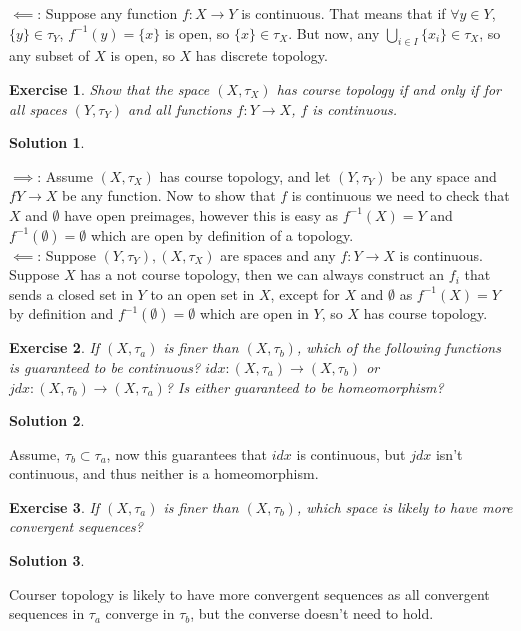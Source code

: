 \documentclass[11pt,a4paper]{article}
\newtheorem{Ex}{Exercise}
\newtheorem{Sol}{Solution}
\begin{document}
\noindent $\impliedby$: Suppose any function $f: X \rightarrow Y$ is continuous. That means that if $\forall y \in Y$, $\{y\} \in \tau_Y$, $f^{-1}(y) = \{x\}$ is open, so $\{x\} \in \tau_X$. But now, any $\bigcup_{i \in I}\{x_i\} \in \tau_X$, so any subset of $X$ is open, so $X$ has discrete topology.

\begin{Ex}
	Show that the space $(X, \tau_X)$ has course topology if and only if for all spaces $(Y, \tau_Y)$ and all functions $f: Y \rightarrow X$, $f$ is continuous. 
\end{Ex}

\begin{Sol} \end{Sol}
\noindent $\implies$: Assume $(X, \tau_X)$ has course topology, and let $(Y, \tau_Y)$ be any space and $f Y \rightarrow X$ be any function. Now to show that $f$ is continuous we need to check that $X$ and $\emptyset$ have open preimages, however this is easy as $f^{-1}(X) = Y$ and $f^{-1}(\emptyset) = \emptyset$ which are open by definition of a topology. \\
\noindent $\impliedby$: Suppose $(Y, \tau_Y), (X, \tau_X)$ are spaces and any $f: Y \rightarrow X$ is continuous. Suppose $X$ has a not course topology, then we can always construct an $f_i$ that sends a closed set in $Y$ to an open set in $X$, except for $X$ and $\emptyset$ as $f^{-1}(X) = Y$ by definition and $f^{-1}(\emptyset) = \emptyset$ which are open in $Y$, so $X$ has course topology.
\begin{Ex}
	If $(X, \tau_a)$ is finer than $(X, \tau_b)$, which of the following functions is guaranteed to be continuous? $idx : (X , \tau_a) \rightarrow (X, \tau_b)$ or $jdx : (X , \tau_b) \rightarrow (X, \tau_a)$? Is either guaranteed to be homeomorphism?
\end{Ex}

\begin{Sol} \end{Sol}
Assume, $\tau_b \subset \tau_a$, now this guarantees that $idx$ is continuous, but $jdx$ isn't continuous, and thus neither is a homeomorphism.

\begin{Ex}
	If $(X, \tau_a)$ is finer than $(X, \tau_b)$, which space is likely to have more convergent sequences?
\end{Ex}

\begin{Sol} \end{Sol}
\noindent Courser topology is likely to have more convergent sequences as all convergent sequences in $\tau_a$ converge in $\tau_b$, but the converse doesn't need to hold. 
\end{document}
